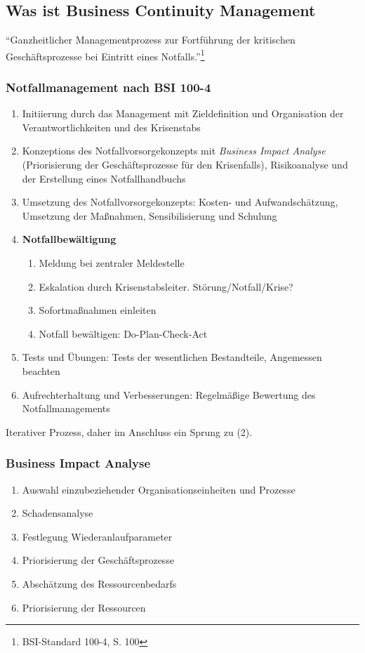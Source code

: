 \subsection{Was ist Business Continuity Management}
"`Ganzheitlicher Managementprozess zur Fortführung der kritischen Geschäftsprozesse bei Eintritt eines Notfalls."'\footnote{BSI-Standard 100-4, S. 100}

\subsubsection{Notfallmanagement nach BSI 100-4}
\begin{enumerate}
	\item Initiierung durch das Management mit Zieldefinition und Organisation der Verantwortlichkeiten und des Krisenstabs
	\item Konzeptions des Notfallvorsorgekonzepts mit \textit{Business Impact Analyse} (Priorisierung der Geschäftsprozesse für den Krisenfalls), Risikoanalyse und der Erstellung eines Notfallhandbuchs
	\item Umsetzung des Notfallvorsorgekonzepts: Kosten- und Aufwandschätzung, Umsetzung der Maßnahmen, Sensibilisierung und Schulung
	\item \textbf{Notfallbewältigung}
	\begin{enumerate}
		\item Meldung bei zentraler Meldestelle
		\item Eskalation durch Krisenstabsleiter. Störung/Notfall/Krise?
		\item Sofortmaßnahmen einleiten
		\item Notfall bewältigen: Do-Plan-Check-Act
	\end{enumerate}
	\item Tests und Übungen: Tests der wesentlichen Bestandteile, Angemessen beachten
	\item Aufrechterhaltung und Verbesserungen: Regelmäßige Bewertung des Notfallmanagements
\end{enumerate}
Iterativer Prozess, daher im Anschluss ein Sprung zu (2).

\subsubsection{Business Impact Analyse}
\begin{enumerate}
	\item Auswahl einzubeziehender Organisationseinheiten und Prozesse
	\item Schadensanalyse
	\item Festlegung Wiederanlaufparameter
	\item Priorisierung der Geschäftsprozesse
	\item Abschätzung des Ressourcenbedarfs
	\item Priorisierung der Ressourcen
\end{enumerate}

